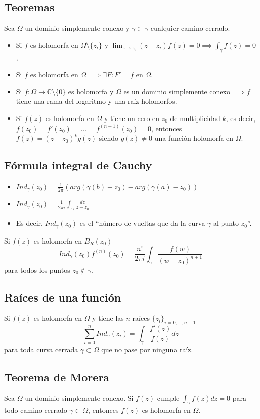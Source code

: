 \documentclass[paper=a4, fontsize=11pt]{scrartcl}
\numberwithin{equation}{section}
\numberwithin{figure}{section}
\numberwithin{table}{section}
\begin{document}
\subsection{Teoremas}
Sea $\Omega$ un dominio simplemente conexo y $\gamma\subset\gamma$ cualquier camino cerrado.
\begin{itemize}
\item Si $f$ es holomorfa en $\Omega\setminus\{z_i\}$ y $\lim_{z\to z_i} (z-z_i)f(z) = 0 \implies \int_{\gamma}f(z) = 0$.
\item Si $f$ es holomorfa en $\Omega$ $\implies \exists F: F'=f$ en $\Omega$.
\item Si $f:\Omega\to\mathbb{C}\setminus\{0\}$ es holomorfa y $\Omega$ es un dominio simplemente conexo $\implies f$ tiene una rama del logaritmo y una raíz holomorfos.
\item Si $f(z)$ es holomorfa en $\Omega$ y tiene un cero en $z_0$ de multiplicidad $k$, es decir, $f(z_0) = f'(z_0) = \hdots = f^{(n-1)}(z_0) = 0$, entonces $f(z) = (z-z_0)^kg(z)$ siendo $g(z)\neq 0$ una función holomorfa en $\Omega$.
\end{itemize}

\subsection{Fórmula integral de Cauchy}
\begin{itemize}
\item $Ind_\gamma (z_0) = \frac{1}{2\pi}\left(arg(\gamma(b)-z_0)-arg(\gamma(a)-z_0)\right)$
\item $Ind_\gamma (z_0) = \frac{1}{2 \pi i}\int_\gamma \frac{dz}{z-z_0}$
\item Es decir, $Ind_\gamma (z_0)$ es el ``número de vueltas que da la curva $\gamma$ al punto $z_0$''.
\end{itemize}
Si $f(z)$ es holomorfa en $B_R(z_0)$
$$\boxed{Ind_\gamma(z_0) f^{(n)}(z_0) = \frac{n!}{2\pi i}\int_\gamma \frac{f(w)}{(w-z_0)^{n+1}}}$$
para todos los puntos $z_0\notin \gamma$.

\subsection{Raíces de una función}
Si $f(z)$ es holomorfa en $\Omega$ y tiene las $n$ raíces $\{{z_i}\}_{i=0,\hdots,n-1}$
$$\sum_{i=0}^n Ind_\gamma(z_i) = \int_\gamma \frac{f'(z)}{f(z)}dz$$
para toda curva cerrada $\gamma\subset\Omega$ que no pase por ninguna raíz.

\subsection{Teorema de Morera}
Sea $\Omega$ un dominio simplemente conexo. Si $f(z)$ cumple $\int_{\gamma} f(z)dz = 0$ para todo camino cerrado $\gamma\subset\Omega$, entonces $f(z)$ es holomorfa en $\Omega$.
\end{document}
